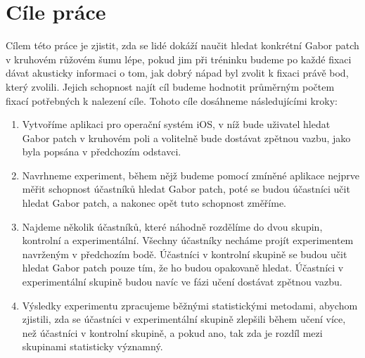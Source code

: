 \chapter{Cíle práce}

Cílem této práce je zjistit, zda se lidé dokáží naučit hledat konkrétní Gabor
patch v kruhovém růžovém šumu lépe, pokud jim při tréninku budeme po každé
fixaci dávat akusticky informaci o tom, jak dobrý nápad byl zvolit k fixaci
právě bod, který zvolili. Jejich schopnost najít cíl budeme hodnotit
průměrným počtem fixací potřebných k nalezení cíle. Tohoto cíle dosáhneme
následujícími kroky:

\begin{enumerate}

\item Vytvoříme aplikaci pro operační systém iOS, v níž bude uživatel hledat
Gabor patch v kruhovém poli a volitelně bude dostávat zpětnou vazbu, jako byla
popsána v předchozím odstavci.

\item Navrhneme experiment, během nějž budeme pomocí zmíněné aplikace nejprve
měřit schopnost účastníků hledat Gabor patch, poté se budou účastníci učit
hledat Gabor patch, a nakonec opět tuto schopnost změříme.

\item Najdeme několik účastníků, které náhodně rozdělíme do dvou skupin,
kontrolní a experimentální. Všechny účastníky necháme projít experimentem
navrženým v předchozím bodě. Účastníci v kontrolní skupině se budou učit hledat
Gabor patch pouze tím, že ho budou opakovaně hledat. Účastníci v experimentální
skupině budou navíc ve fázi učení dostávat zpětnou vazbu.

\item Výsledky experimentu zpracujeme běžnými statistickými metodami, aby\-chom
zjistili, zda se účastníci v experimentální skupině zlepšili během učení více,
než účastníci v kontrolní skupině, a pokud ano, tak zda je rozdíl mezi
skupinami statisticky významný.

\end{enumerate} 
